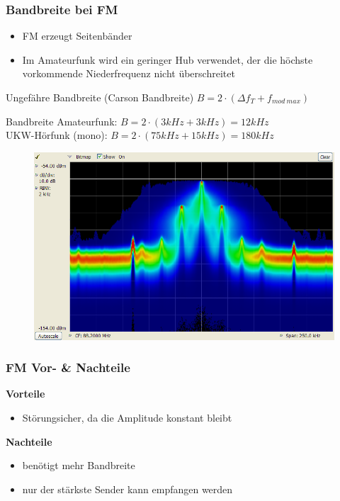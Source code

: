 \begin{frame}
  \frametitle{Bandbreite bei FM}
  \begin{itemize}
    \item FM erzeugt Seitenbänder
    \item Im Amateurfunk wird ein geringer Hub verwendet, der die höchste vorkommende Niederfrequenz nicht überschreitet
  \end{itemize}
  \begin{block}{Ungefähre Bandbreite (Carson Bandbreite)}
    $B = 2 \cdot (\Delta f_T + f_{mod~max})$
  \end{block}
  \begin{exampleblock}{Bandbreite}
    Amateurfunk: $B =2 \cdot (3kHz + 3kHz) = 12kHz$\\
    UKW-Hörfunk (mono): $B = 2 \cdot (75kHz + 15kHz) = 180kHz$
  \end{exampleblock}
\end{frame}

\begin{frame}
  \begin{center}
    \begin{figure}
      \includegraphics[width=1\textwidth,height=.85\textheight,keepaspectratio]{e16/Dpx-fm-radio.png}
    \end{figure}
  \end{center}
\end{frame}


\begin{frame}
  \frametitle{FM Vor- \& Nachteile}
  \textbf{\Large{Vorteile}}
  \begin{itemize}
    \item Störungsicher, da die Amplitude konstant bleibt
  \end{itemize}
  \vspace{1cm}
  \textbf{\Large{Nachteile}}
  \begin{itemize}
    \item benötigt mehr Bandbreite
    \item nur der stärkste Sender kann empfangen werden
  \end{itemize}
\end{frame}

